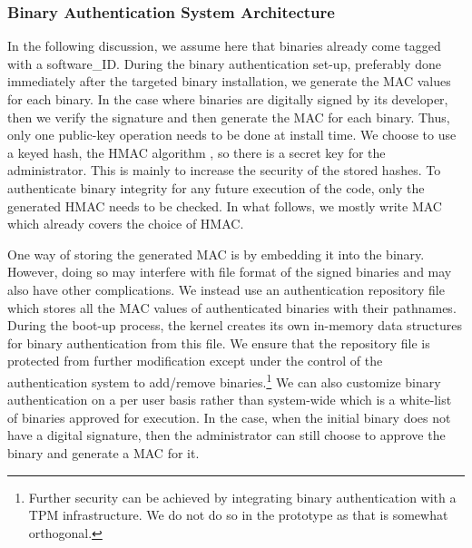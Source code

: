 \subsubsection{Binary Authentication System Architecture}



In the following discussion, we assume here that binaries already come 
tagged with a software\_ID. 
During the binary authentication set-up, preferably done immediately after 
the targeted binary installation, we generate the MAC values for each binary.
In the case where binaries are digitally signed by its developer,
then we verify the signature and then generate the MAC for each binary.
Thus, only one public-key operation needs to be done at install time.
We choose to use a keyed hash, the HMAC algorithm \cite{krawczyk1997rfc2104},
so there is a secret key for the administrator. This is mainly to increase
the security of the stored hashes.
To authenticate binary integrity for any future execution of the code,
only the generated HMAC needs to be checked.
In what follows, we mostly write MAC which already covers the choice of HMAC.

One way of storing the generated MAC is by embedding it into the binary.
However, doing so may interfere with file format of the signed binaries
and may also have other complications. 
We instead use an authentication repository file
which stores all the MAC values of authenticated binaries
with their pathnames.
During the boot-up process, the kernel creates its own in-memory data structures
for binary authentication from this file. 
We ensure that the repository file is protected from further modification
except under the control of the authentication system to 
add/remove binaries.\footnote{
Further security can be achieved by integrating binary authentication
with a TPM infrastructure. We do not do so in the prototype as that is
somewhat orthogonal.
}
We can also customize binary authentication on a per user basis rather
than system-wide which is a white-list of
binaries approved for execution.
In the case, when the initial binary does not have a digital signature, then
the administrator can still choose to approve the binary and generate a MAC
for it.

